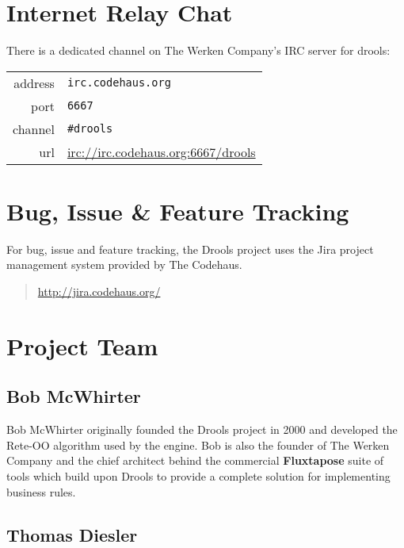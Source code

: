 \section{Internet Relay Chat}

There is a dedicated channel on The Werken Company's IRC server for
drools:\\

\begin{tabular}{rl}
address & \verb|irc.codehaus.org| \\
port    & \verb|6667| \\
channel & \verb|#drools|\\
url     & \url{irc://irc.codehaus.org:6667/drools}\\
\end{tabular}

\bigskip

\section{Bug, Issue \& Feature Tracking}

For bug, issue and feature tracking, the Drools project uses the
Jira project management system provided by The Codehaus.

\begin{quote}
    \url{http://jira.codehaus.org/}
\end{quote}

\clearpage

\section{Project Team}

\subsection{Bob McWhirter}

Bob McWhirter originally founded the Drools project in 2000 and
developed the Rete-OO algorithm used by the engine.  Bob is also
the founder of The Werken Company and the chief architect behind
the commercial \textbf{Fluxtapose} suite of tools which build
upon Drools to provide a complete solution for implementing
business rules.

\subsection{Thomas Diesler}

